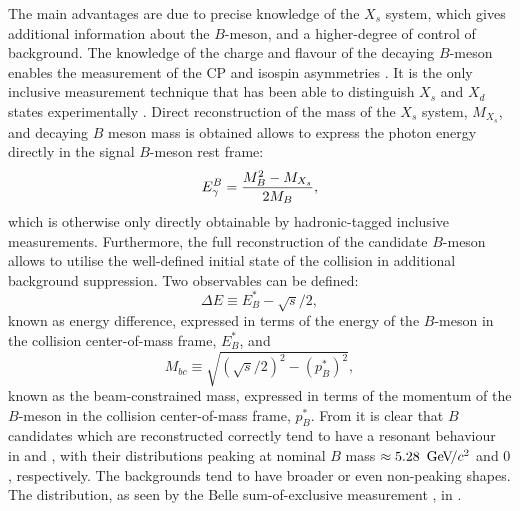 The main advantages are due to precise knowledge of the $X_s$ system, which gives additional information about the $B$-meson, and a higher-degree of control of background.
The knowledge of the charge and flavour of the decaying $B$-meson enables the measurement of the CP and isospin asymmetries \cite{BaBar:2014czi}.
It is the only inclusive measurement technique that has been able to distinguish $X_s$ and $X_d$ states experimentally \cite{BaBar:2010vgu}.
Direct reconstruction of the mass of the $X_s$ system, $M_{X_s}$, and decaying $B$ meson mass is obtained allows to express the photon energy directly in the signal $B$-meson rest frame:
\begin{equation}
    {\ensuremath{E^B_{\gamma}}} = \frac{M_B^2 - M_{X_s}}{2M_B},
\end{equation}
which is otherwise only directly obtainable by hadronic-tagged inclusive measurements.
Furthermore, the full reconstruction of the candidate $B$-meson allows to utilise the well-defined initial state of the \epem collision in additional background suppression.
Two observables can be defined:
\begin{equation}\label{eq:deltae_inclusive}
    \Delta E \equiv E^*_B - \sqrt{s}/2,
\end{equation}
known as energy difference, expressed in terms of the energy of the $B$-meson in the collision center-of-mass frame, $E^*_B$, and
\begin{equation}\label{eq:mbc_exclusive}
    M_{bc} \equiv \sqrt{(\sqrt{s}/2)^2 - (p^*_B)^2},
\end{equation}
known as the beam-constrained mass, expressed in terms of the momentum of the $B$-meson in the collision center-of-mass frame, $p^*_B$.
From  it is clear that $B$ candidates which are reconstructed correctly tend to have a resonant behaviour in \Mbc and \DeltaE, with their distributions peaking at nominal $B$ mass $\approx5.28~{\mathrm{\,Ge\kern -0.1em V\!/}c^2}$ and $0$, respectively.
The backgrounds tend to have broader or even non-peaking shapes. 
The \Mbc distribution, as seen by the Belle sum-of-exclusive measurement \cite{Belle:2014nmp}, in .

